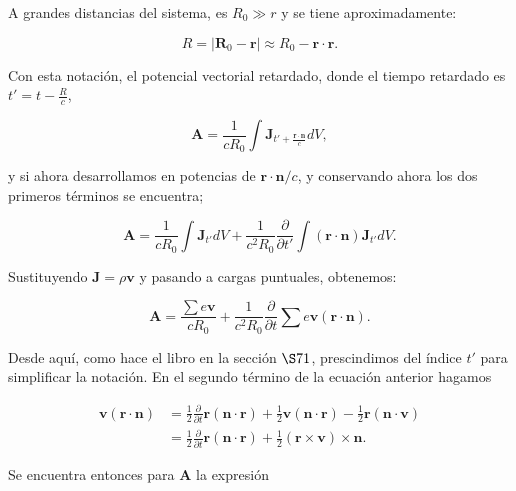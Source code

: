 \documentclass[a4paper,11pt]{article}
\numberwithin{equation}{section}
\begin{document}
\vspace{.3cm}

A grandes distancias del sistema, es $R_0 \gg r$ y se tiene aproximadamente: 

\begin{equation}
 R = |\mathbf{R}_0 - \mathbf{r}| \approx R_0 - \mathbf{r} \cdot \mathbf{r}.
\end{equation}

Con esta notación, el potencial vectorial retardado, donde el tiempo retardado 
es $t' = t - \frac{R}{c}$, 

\begin{equation}
 \mathbf{A} = \frac{1}{cR_0}\int \mathbf{J}_{t' + \frac{\mathbf{r}\cdot\mathbf{n}}{c}} dV,  
\end{equation}

y si ahora desarrollamos en potencias de $\mathbf{r}\cdot \mathbf{n}/c$, y 
conservando ahora los dos primeros términos se encuentra;

\begin{equation}
 \mathbf{A} = \frac{1}{cR_0} \int \mathbf{J}_{t'}dV + \frac{1}{c^2R_0} 
 \frac{\partial}{\partial t'} \int (\mathbf{r} \cdot \mathbf{n})\mathbf{J}_{t'} dV.
\end{equation}

Sustituyendo $\mathbf{J} = \rho \mathbf{v}$ y pasando a cargas puntuales, obtenemos:

\begin{equation}
 \mathbf{A} = \frac{\sum e \mathbf{v}}{cR_0} + \frac{1}{c^2R_0}\frac{\partial}{\partial t}
 \sum e \mathbf{v} (\mathbf{r} \cdot \mathbf{n}).
\end{equation}

Desde aquí, como hace el libro en la sección $\S 71$, prescindimos del índice $t'$
para simplificar la notación. En el segundo término de la ecuación anterior 
hagamos 

\begin{align*}
 \mathbf{v}(\mathbf{r} \cdot \mathbf{n}) &= \frac{1}{2} \frac{\partial}{\partial t}
 \mathbf{r}(\mathbf{n} \cdot \mathbf{r}) + \frac{1}{2}\mathbf{v}(\mathbf{n} \cdot \mathbf{r})
 - \frac{1}{2}\mathbf{r}(\mathbf{n} \cdot \mathbf{v}) \\
 &=  \frac{1}{2} \frac{\partial}{\partial t}\mathbf{r}(\mathbf{n} \cdot \mathbf{r})
 + \frac{1}{2} (\mathbf{r} \times \mathbf{v}) \times \mathbf{n}.
\end{align*}

Se encuentra entonces para $\mathbf{A}$ la expresión 
\end{document}
